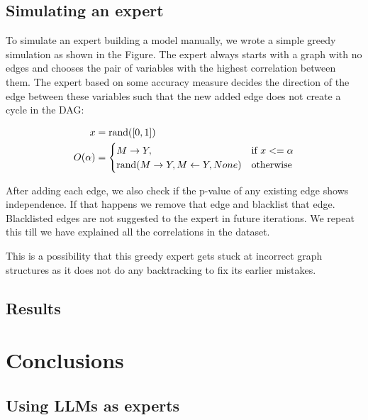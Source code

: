 \documentclass{article}
\begin{document}
\subsection{Simulating an expert}
To simulate an expert building a model manually, we wrote a simple greedy simulation as shown in the Figure. The expert always starts with a graph with
no edges and chooses the pair of variables with the highest correlation between them. The expert based on some accuracy measure decides the direction
of the edge between these variables such that the new added edge does not create a cycle in the DAG:

\begin{equation}
	\begin{split}
		x &= \textnormal{rand}([0, 1]) \\
		O(\alpha) &= \begin{cases} 
			M \rightarrow Y, & \textnormal{if  } x <= \alpha \\
			\textnormal{rand}(M \rightarrow Y, M \leftarrow Y, None) & \textnormal{otherwise} \\
			     \end{cases} \\
	\end{split}
\end{equation}

After adding each edge, we also check if the p-value of any existing edge shows independence. If that happens we remove that edge and blacklist that edge. 
Blacklisted edges are not suggested to the expert in future iterations. We repeat this till we have explained all the correlations in the dataset.

This is a possibility that this greedy expert gets stuck at incorrect graph structures as it does not do any backtracking to fix its earlier mistakes.


\subsection{Results}

\section{Conclusions}
\subsection{Using LLMs as experts}
\end{document}
